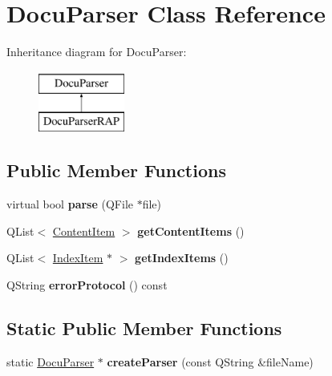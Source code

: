 \hypertarget{classDocuParser}{
\section{DocuParser Class Reference}
\label{classDocuParser}
}
Inheritance diagram for DocuParser:\begin{figure}[H]
\begin{center}
\leavevmode
\includegraphics[height=2.000000cm]{classDocuParser}
\end{center}
\end{figure}
\subsection*{Public Member Functions}
\begin{DoxyCompactItemize}
\item 
\hypertarget{classDocuParser_aac918a2957f7ce56d81339c65a0f0d57}{
virtual bool {\bfseries parse} (QFile $\ast$file)}
\label{classDocuParser_aac918a2957f7ce56d81339c65a0f0d57}

\item 
\hypertarget{classDocuParser_a5163e8d55457ffc1894247460b31ddfc}{
QList$<$ \hyperlink{structContentItem}{ContentItem} $>$ {\bfseries getContentItems} ()}
\label{classDocuParser_a5163e8d55457ffc1894247460b31ddfc}

\item 
\hypertarget{classDocuParser_a88ac008026ff024ba261f765fedb2d35}{
QList$<$ \hyperlink{structIndexItem}{IndexItem} $\ast$ $>$ {\bfseries getIndexItems} ()}
\label{classDocuParser_a88ac008026ff024ba261f765fedb2d35}

\item 
\hypertarget{classDocuParser_a17f3870eb6e061fc53dc287991bcb673}{
QString {\bfseries errorProtocol} () const }
\label{classDocuParser_a17f3870eb6e061fc53dc287991bcb673}

\end{DoxyCompactItemize}
\subsection*{Static Public Member Functions}
\begin{DoxyCompactItemize}
\item 
\hypertarget{classDocuParser_a56d7694198bf2e21fc6c8a3900a72faf}{
static \hyperlink{classDocuParser}{DocuParser} $\ast$ {\bfseries createParser} (const QString \&fileName)}
\label{classDocuParser_a56d7694198bf2e21fc6c8a3900a72faf}

\end{DoxyCompactItemize}
